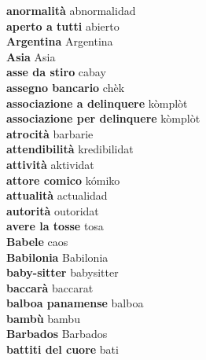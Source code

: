 \textbf{ anormalità  } abnormalidad \\
\textbf{ aperto a tutti  } abierto \\
\textbf{ Argentina  } Argentina \\
\textbf{ Asia  } Asia \\
\textbf{ asse da stiro  } cabay \\
\textbf{ assegno bancario  } chèk \\
\textbf{ associazione a delinquere  } kòmplòt \\
\textbf{ associazione per delinquere  } kòmplòt \\
\textbf{ atrocità  } barbarie \\
\textbf{ attendibilità  } kredibilidat \\
\textbf{ attività  } aktividat \\
\textbf{ attore comico  } kómiko \\
\textbf{ attualità  } actualidad \\
\textbf{ autorità  } outoridat \\
\textbf{ avere la tosse  } tosa \\
\textbf{ Babele  } caos \\
\textbf{ Babilonia  } Babilonia \\
\textbf{ baby-sitter  } babysitter \\
\textbf{ baccarà  } baccarat \\
\textbf{ balboa panamense  } balboa \\
\textbf{ bambù  } bambu \\
\textbf{ Barbados  } Barbados \\
\textbf{ battiti del cuore  } bati \\
